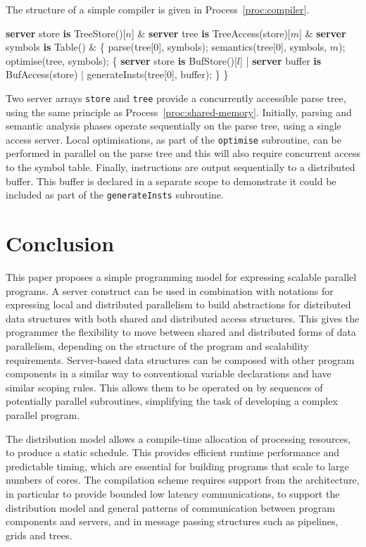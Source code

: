 \documentclass[11pt, conference, compsocconf, onecolumn]{IEEEtran}
\newcommand{\ttt}[1]{\texttt{#1}}
\newcommand{\proc}[1]{Process~\ref{proc:#1}}
\newcounter{process}
\newenvironment{Process}[1][]{\begin{procfloat}[ht]\vspace{-1.5mm}\refstepcounter{process}{\bf Process~\theprocess} #1}
{\vspace{-3.5mm}\end{procfloat}}
\newcommand{\w}[1]{{\bf #1}}
\def\codespacing{1.5mm}
\newenvironment{myquote}
{\list{}{\leftmargin=4mm\rightmargin=4mm}\item[]}
{\endlist}
\newenvironment{code*}{\vspace{\codespacing}\begin{myquote}\begin{minipage}{\linewidth}\begin{alltt}}
{\end{alltt}\end{minipage}
\end{myquote}\vspace{\codespacing}
}
\begin{document}
The structure of a simple compiler is given in \proc{compiler}. 
\begin{Process}
\begin{code*}
\w{server} store \w{is} TreeStore()[\(n\)] &
\w{server} tree \w{is} TreeAccess(store)[\(m\)] &
\w{server} symbols \w{is} Table() &
\{ parse(tree[0], symbols);
  semantics(tree[0], symbols, \(m\));
  optimise(tree, symbols);
  \{ \w{server} store \w{is} BufStore()[\(l\)] |
    \w{server} buffer \w{is} BufAccess(store) |
    generateInsts(tree[0], buffer);
  \}
\}
\end{code*}
\label{proc:compiler}
\end{Process}
Two server arrays \ttt{store} and \ttt{tree} provide a concurrently accessible
parse tree, using the same principle as \proc{shared-memory}. Initially, parsing and
semantic analysis phases operate sequentially on the parse tree, using a single
access server. Local optimisations, as part of the \ttt{optimise} subroutine,
can be performed in parallel on the parse tree and this will also require
concurrent access to the symbol table. Finally, instructions are
output sequentially to a distributed buffer. This buffer is declared in a separate
scope to demonstrate it could be included as part of the \ttt{generateInsts}
subroutine.





\section{Conclusion\label{sec:conclusion}}

This paper proposes a simple programming model for expressing scalable parallel
programs. 
A server construct can be used in combination with notations for expressing
local and distributed parallelism to build abstractions for distributed data
structures with both shared and distributed access structures. This gives the
programmer the flexibility to move between shared and distributed forms of data
parallelism, depending on the structure of the program and scalability
requirements. 
Server-based data structures can be composed with other program components in a
similar way to conventional variable declarations and have similar scoping
rules. This allows them to be operated on by sequences of potentially parallel
subroutines, simplifying the task of developing a complex parallel program.

The distribution model allows a compile-time allocation of processing
resources, to produce a static schedule. This provides efficient runtime
performance and predictable timing, which are essential for building programs
that scale to large numbers of cores.
The compilation scheme requires support from the architecture, in particular to
provide bounded low latency communications, to support the distribution model
and general patterns of communication between program components and servers,
and in message passing structures such as pipelines, grids and trees.
\end{document}
